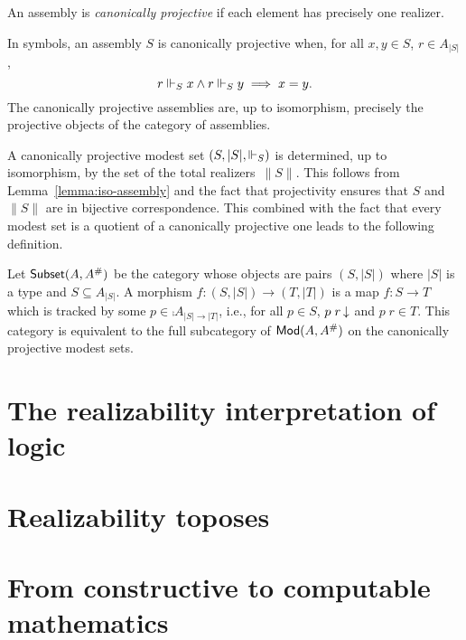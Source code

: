 \begin{definition}
  An assembly is \emph{canonically projective} if each element has
  precisely one realizer.
\end{definition}

\noindent
In symbols, an assembly $S$ is canonically projective when, for all
$x, y \in S$, $r \in A_{|S|}$,
%
\begin{equation*}
  r \Vdash_S x \land r \Vdash_S y \implies x = y.
\end{equation*}
%
The canonically projective assemblies are, up to isomorphism,
precisely the projective objects of the category of assemblies.

A canonically projective modest set $(S, |S|, {\Vdash_S})$ is determined,
up to isomorphism, by the set of the total realizers~$\|S\|$. This
follows from Lemma~\ref{lemma:iso-assembly} and the fact that
projectivity ensures that $S$ and $\|S\|$ are in bijective
correspondence. This combined with the fact that every modest set is a
quotient of a canonically projective one leads to the following
definition.

Let $\mathsf{Subset}(A, A^{\#})$ be the category whose objects are pairs
$(S, |S|)$ where $|S|$ is a type and $S \subseteq A_{|S|}$. A morphism
$f : (S, |S|) \to (T, |T|)$ is a map $f : S \to T$ which is tracked by
some $p \in \comp{A}_{|S| \to |T|}$, i.e., for all $p \in S$,
$p\;r\,{\downarrow}$ and $p\;r \in T$. This category is equivalent to the
full subcategory of $\mathsf{Mod}(A, A^{\#})$ on the canonically projective
modest sets.


\section{The realizability interpretation of logic}
\label{sec:realizability-interpretation}

\section{Realizability toposes}
\label{sec:realizability-toposes}

\section{From constructive to computable mathematics}
\label{sec:constructive-math}



